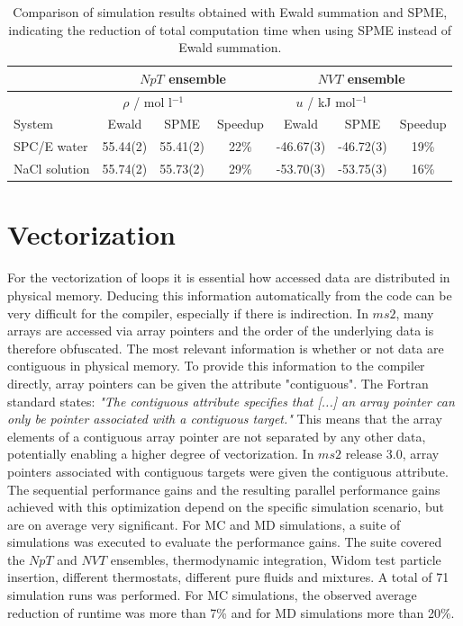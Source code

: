 \documentclass[preprint,12pt]{elsarticle}
\begin{document}
\begin{table}[htb]
\caption{\textcolor[rgb]{0,0.58,0}{Comparison of simulation results obtained with Ewald summation and SPME, indicating the reduction of total computation time when using SPME instead of Ewald summation.}}
\centering
\begin{tabular}{l| c | c| c | c | c | c}
\hline
\multicolumn{1}{c|}{} & 	\multicolumn{3}{c|}{$NpT$ ensemble} & \multicolumn{3}{c}{$NVT$ ensemble} \\ \hline	
\multicolumn{1}{c|}{} & 	\multicolumn{2}{c|}{$\rho$ / mol l$^{-1}$} & \multicolumn{1}{c|}{} & \multicolumn{2}{c|}{$u$ / kJ mol$^{-1}$} & \multicolumn{1}{c}{} \\ 	
\multicolumn{1}{l|}{System} & 	\multicolumn{1}{c|}{Ewald} & 	\multicolumn{1}{c|}{SPME} & \multicolumn{1}{c|}{Speedup} & 	\multicolumn{1}{c|}{Ewald} & 	\multicolumn{1}{c|}{SPME} & \multicolumn{1}{c}{Speedup} \\ \hline
\multicolumn{1}{l|}{SPC/E water}		&	55.44(2)&	55.41(2)&	22\%	&	-46.67(3)&	-46.72(3)&  19\%\\
\multicolumn{1}{l|}{NaCl solution}		&	55.74(2)&	55.73(2)&	29\%	&	-53.70(3)&	-53.75(3)&  16\%\\ \hline
\end{tabular}
\label{Tab:EStatics}
\end{table}

\section{Vectorization}
\label{sec:vectorization} 

For the vectorization of loops it is essential how accessed data are distributed in physical memory. Deducing this information automatically from the code can be very difficult for the compiler, especially if there is indirection. In $ms2$, many arrays are accessed via array pointers and the order of the underlying data is therefore obfuscated. The most relevant information is whether or not data are contiguous in physical memory. To provide this information to the compiler directly, array pointers can be given the attribute "contiguous". The Fortran standard states: \textit{"The contiguous attribute specifies that [...] an array pointer can only be pointer associated with a contiguous target."} 
This means that  the array elements of a contiguous array pointer are not separated by any other data, potentially enabling a higher degree of vectorization.
In $ms2$ release 3.0, array pointers associated with contiguous targets were given the contiguous attribute. The sequential performance gains and the resulting parallel performance gains achieved with this optimization depend on the specific simulation scenario, but are on average very significant. For MC and MD simulations, a suite of simulations was executed to evaluate the performance gains. The suite covered the $NpT$ and $NVT$ ensembles, thermodynamic integration, Widom test particle insertion, different thermostats, different pure fluids and mixtures. A total of 71 simulation runs was performed. 
For MC simulations, the observed average reduction of runtime was more than 7\% and for MD simulations   more than 20\%.
\end{document}
